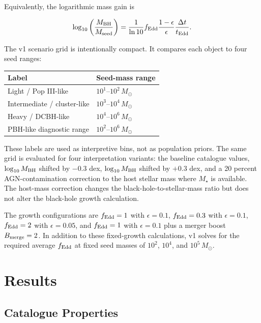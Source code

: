\documentclass[letterpaper,12pt]{article}
\begin{document}
Equivalently, the logarithmic mass gain is

\begin{equation}
\log_{10}\left(\frac{M_{\rm BH}}{M_{\rm seed}}\right)
=
\frac{1}{\ln 10}
f_{\rm Edd}
\frac{1-\epsilon}{\epsilon}
\frac{\Delta t}{t_{\rm Edd}}.
\label{eq:log_growth}
\end{equation}

The v1 scenario grid is intentionally compact. It compares each object to four seed ranges:

\begin{center}
\begin{tabular}{ll}
\toprule
Label & Seed-mass range \\
\midrule
Light / Pop III-like & $10^1$--$10^2\,M_\odot$ \\
Intermediate / cluster-like & $10^3$--$10^4\,M_\odot$ \\
Heavy / DCBH-like & $10^4$--$10^6\,M_\odot$ \\
PBH-like diagnostic range & $10^2$--$10^6\,M_\odot$ \\
\bottomrule
\end{tabular}
\end{center}

These labels are used as interpretive bins, not as population priors. The same grid is evaluated for four interpretation variants: the baseline catalogue values, $\log_{10}M_{\rm BH}$ shifted by $-0.3$ dex, $\log_{10}M_{\rm BH}$ shifted by $+0.3$ dex, and a 20 percent AGN-contamination correction to the host stellar mass where $M_\star$ is available. The host-mass correction changes the black-hole-to-stellar-mass ratio but does not alter the black-hole growth calculation.

The growth configurations are $f_{\rm Edd}=1$ with $\epsilon=0.1$, $f_{\rm Edd}=0.3$ with $\epsilon=0.1$, $f_{\rm Edd}=2$ with $\epsilon=0.05$, and $f_{\rm Edd}=1$ with $\epsilon=0.1$ plus a merger boost $B_{\rm merge}=2$. In addition to these fixed-growth calculations, v1 solves for the required average $f_{\rm Edd}$ at fixed seed masses of $10^2$, $10^4$, and $10^5\,M_\odot$.

\section{Results}

\subsection{Catalogue Properties}
\end{document}

